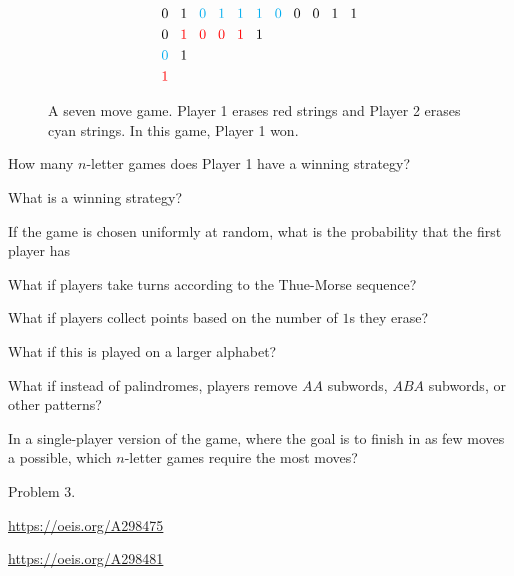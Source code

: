 \documentclass{article}
\begin{document}
\begin{figure}[ht!]
\begin{align*}
    &0 \hspace{3mm} 1 \hspace{3mm} {\color{cyan} 0 \hspace{3mm} 1 \hspace{3mm} 1 \hspace{3mm} 1 \hspace{3mm} 0} \hspace{3mm} 0 \hspace{3mm} 0 \hspace{3mm} 1 \hspace{3mm} 1 \\
    &0 \hspace{3mm} {\color{red} 1 \hspace{3mm} 0 \hspace{3mm} 0 \hspace{3mm} 1} \hspace{3mm} 1 \\
    &{\color{cyan} 0} \hspace{3mm} 1 \\
    &{\color{red} 1}
  \end{align*}
  \caption{
    A seven move game. Player 1 erases red strings
    and Player 2 erases cyan strings. In this game, Player 1 won.
  }
\end{figure}

\begin{question}
  How many $n$-letter games does Player 1 have a winning strategy?
\end{question}

\begin{related}
  \item What is a winning strategy?
  \item If the game is chosen uniformly at random, what is the probability that
    the first player has
  \item What if players take turns according to the Thue-Morse sequence?
  \item What if players collect points based on the number of $1$s they erase?
  \item What if this is played on a larger alphabet?
  \item What if instead of palindromes, players remove $AA$ subwords,
    $ABA$ subwords, or other patterns?
  \item In a single-player version of the game, where the goal is to finish in
    as few moves a possible, which $n$-letter games require the most moves?
\end{related}

\begin{references}
  \item Problem 3.
  \item \url{https://oeis.org/A298475}
  \item \url{https://oeis.org/A298481}
\end{references}
\end{document}
